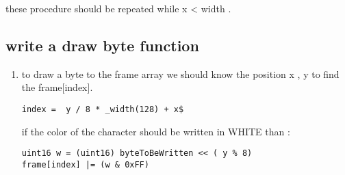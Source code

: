 \documentclass[11pt]{article}
\begin{document}
these procedure should be repeated while x < width .     
\subsection{write a draw byte function}
\begin{enumerate}
\item to draw a byte to the frame array we should know the position x , y to find the frame[index].\\
\begin{lstlisting}
index =  y / 8 * _width(128) + x$ 
\end{lstlisting}
if the color of the character should be written in WHITE than : \\
\begin{lstlisting}
uint16 w = (uint16) byteToBeWritten << ( y % 8) 
frame[index] |= (w & 0xFF)
\end{lstlisting}


\end{enumerate}
\end{document}
